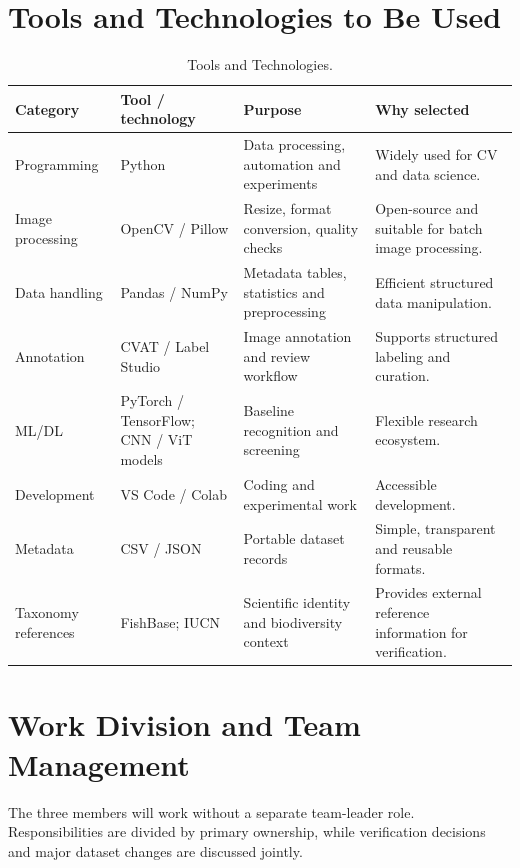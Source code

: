 \documentclass[12pt,a4paper]{article}
\begin{document}
\section{Tools and Technologies to Be Used}

\begin{table}[H]
\centering
\caption{Tools and Technologies.}
\small
\begin{tabularx}{\textwidth}{|p{1.0in}|p{1.2in}|X|p{1.2in}|}
\hline
\textbf{Category} & \textbf{Tool / technology} & \textbf{Purpose} & \textbf{Why selected} \\
\hline
Programming & Python & Data processing, automation and experiments & Widely used for CV and data science. \\
\hline
Image processing & OpenCV / Pillow & Resize, format conversion, quality checks & Open-source and suitable for batch image processing. \\
\hline
Data handling & Pandas / NumPy & Metadata tables, statistics and preprocessing & Efficient structured data manipulation. \\
\hline
Annotation & CVAT / Label Studio & Image annotation and review workflow & Supports structured labeling and curation. \\
\hline
ML/DL & PyTorch / TensorFlow; CNN / ViT models & Baseline recognition and screening & Flexible research ecosystem. \\
\hline
Development & VS Code / Colab & Coding and experimental work & Accessible development. \\
\hline
Metadata & CSV / JSON & Portable dataset records & Simple, transparent and reusable formats. \\
\hline
Taxonomy references & FishBase; IUCN & Scientific identity and biodiversity context & Provides external reference information for verification. \\
\hline
\end{tabularx}
\end{table}


\section{Work Division and Team Management}

The three members will work without a separate team-leader role. Responsibilities are divided by primary ownership, while verification decisions and major dataset changes are discussed jointly.
\end{document}
